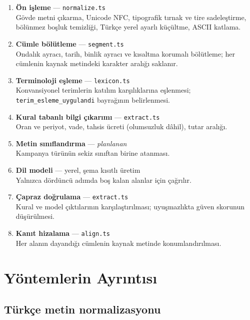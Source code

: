 \documentclass[11pt,a4paper]{article}
\newcommand{\dosya}[1]{\textcolor{kod}{\texttt{#1}}}
\begin{document}
\begin{enumerate}[leftmargin=1.4cm,itemsep=5pt]
  \item \textbf{Ön işleme} --- \dosya{normalize.ts}\\
        Gövde metni çıkarma, Unicode NFC, tipografik tırnak ve tire
        sadeleştirme, bölünmez boşluk temizliği, Türkçe yerel ayarlı küçültme,
        ASCII katlama.
  \item \textbf{Cümle bölütleme} --- \dosya{segment.ts}\\
        Ondalık ayracı, tarih, binlik ayracı ve kısaltma korumalı bölütleme;
        her cümlenin kaynak metindeki karakter aralığı saklanır.
  \item \textbf{Terminoloji eşleme} --- \dosya{lexicon.ts}\\
        Konvansiyonel terimlerin katılım karşılıklarına eşlenmesi;
        \texttt{terim\_esleme\_uygulandi} bayrağının belirlenmesi.
  \item \textbf{Kural tabanlı bilgi çıkarımı} --- \dosya{extract.ts}\\
        Oran ve periyot, vade, tahsis ücreti (olumsuzluk dâhil), tutar aralığı.
  \item \textbf{Metin sınıflandırma} --- \emph{planlanan}\\
        Kampanya türünün sekiz sınıftan birine atanması.
  \item \textbf{Dil modeli} --- yerel, şema kısıtlı üretim\\
        Yalnızca dördüncü adımda boş kalan alanlar için çağrılır.
  \item \textbf{Çapraz doğrulama} --- \dosya{extract.ts}\\
        Kural ve model çıktılarının karşılaştırılması; uyuşmazlıkta güven
        skorunun düşürülmesi.
  \item \textbf{Kanıt hizalama} --- \dosya{align.ts}\\
        Her alanın dayandığı cümlenin kaynak metinde konumlandırılması.
\end{enumerate}

\section{Yöntemlerin Ayrıntısı}

\subsection{Türkçe metin normalizasyonu}
\end{document}
